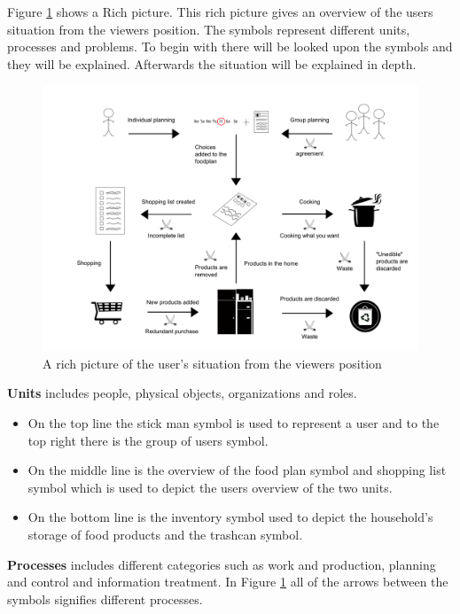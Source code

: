 Figure \ref{RigtBillede} shows a Rich picture. This rich picture gives an overview of the users situation from the viewers position.
The symbols represent different units, processes and problems.
To begin with there will be looked upon the symbols and they will be explained. Afterwards the situation will be explained in depth.

  \begin{figure}[H]
	\centering
	\includegraphics[width=1.00\textwidth]{Grafik/FoodPlanner/InkscapeTegninger/RigtBillede.pdf}
	\caption{A rich picture of the user's situation from the viewers position}
	\label{RigtBillede}
\end{figure}
\textbf{Units} includes people, physical objects, organizations and roles.
\begin{itemize}
  \item On the top line the stick man symbol is used to represent a user and to the top right there is the group of users symbol. 
  \item On the middle line is the overview of the food plan symbol and shopping list symbol which is used to depict the users overview of the two units. 
  \item On the bottom line is the inventory symbol used to depict the household's storage of food products and the trashcan symbol.    
\end{itemize}
\textbf{Processes} includes different categories such as work and production, planning and control and information treatment. In Figure \ref{RigtBillede} all of the arrows between the symbols signifies different processes.
